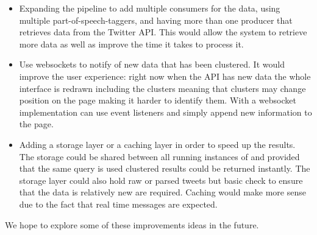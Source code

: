 \begin{itemize}
	\item Expanding the pipeline to add multiple consumers for the data, using multiple part-of-speech-taggers, and having more than one producer that retrieves data from the Twitter API. This would allow the system to retrieve more data as well as improve the time it takes to process it.
	\item Use websockets to notify {\frontend}  of new data that has been clustered. It would improve the user experience: right now when the API has new data the whole interface is redrawn including the clusters meaning that clusters may change position on the page making it harder to identify them. With a websocket implementation {\frontend}  can use event listeners and simply append new information to the page.
	\item Adding a storage layer or a caching layer in order to speed up the results. The storage could be shared between all running instances of {\project}  and provided that the same query is used clustered results could be returned instantly. The storage layer could also hold raw or parsed tweets but basic check to ensure that the data is relatively new are required. Caching would make more sense due to the fact that real time messages are expected.
\end{itemize}
We hope to explore some of these improvements ideas in the future.